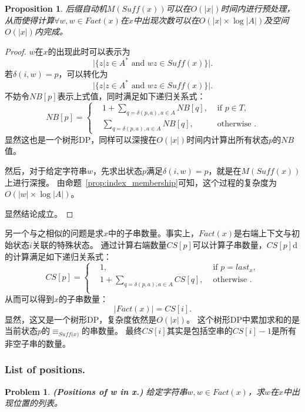 \documentclass[UTF8]{ctexart}
\newtheorem{prop}[thm]{Proposition}
\newtheorem{prob}[thm]{Problem}
\theoremstyle{definition}
\theoremstyle{remark}
\numberwithin{equation}{subsection}
\newcommand{\Emph}{\textbf}
\newcommand{\equsuf}[1][x]{\equiv_{\textit{Suff(#1)}}}
\newcommand{\Suff}{\textit{Suff}}
\begin{document}
	\begin{prop}
		后缀自动机$M(\Suff(x))$可以在$O(|x|)$时间内进行预处理，
		从而使得计算$\forall w, w \in Fact(x)$在$x$中出现次数可以在$O(|x| \times \log |A|)$及空间$O(|x|)$内完成。
	\end{prop}
	\begin{proof}
		$w$在$x$的出现此时可以表示为
		\[
			|\{ z | z \in A^* \text{ and } wz \in \Suff(x) \}|.
		\]
		若$\delta(i, w) = p$，可以转化为
		\[
			|\{ z | z \in A^* \text{ and } wz \in \Suff(x) \}|.
		\]
		不妨令$NB[p]$表示上式值，同时满足如下递归关系式：
		\[
			NB[p] =
			\left\{
				\begin{aligned}
					&1 + \sum_{q = \delta(p, a),a \in A} NB[q],     &\text{ if } p \in T,   \\
					&\sum_{q = \delta(p,a), a \in A} NB[q],         &\text{ otherwise }.
				\end{aligned}
			\right .
		\]
		显然这也是一个树形DP，同样可以深搜在$O(|x|)$时间内计算出所有状态$p$的$NB$值。
		
		然后，对于给定字符串$w$，先求出状态$p$满足$\delta(i, w) = p$，就是在$M(\Suff(x))$上进行深搜。
		由命题~\ref{prop:index_membership}可知，这个过程的复杂度为$O(|w| \times \log |A|)$。
		
		显然结论成立。
	\end{proof}
	
	另一个与之相似的问题是求$x$中的子串数量。事实上，$Fact(x)$是右端上下文与初始状态$i$关联的特殊状态。
	通过计算右端数量$CS[p]$可以计算子串数量，$CS[p]$d的计算满足如下递归关系式：
	\[
		CS[p] =
		\left\{
			\begin{aligned}
				&1,			&\text{ if } p = last_x,	\\
				&1 + \sum_{q = \delta(p, a), a \in A} CS[q],	&\text{ otherwise }.	\\
			\end{aligned}
		\right .
	\]
	从而可以得到$x$的子串数量：
	\[
		|Fact(x)| = CS[i].
	\]
	显然，这又是一个树形DP，复杂度依然是$O(|x|)$。
	这个树形DP中累加求和的是当前状态$p$的$\equsuf[x]$的串数量。
	最终$CS[i]$其实是包括空串的$CS[i]-1$是所有非空子串的数量。
	
\subsubsection{List of positions.}
\label{subsub:idx_lop}
	
	\begin{prob}
		\Emph{(Positions of w in x.)}
		给定字符串$w, w \in Fact(x)$，求$w$在$x$中出现位置的列表。
	\end{prob}
	
\end{document}
